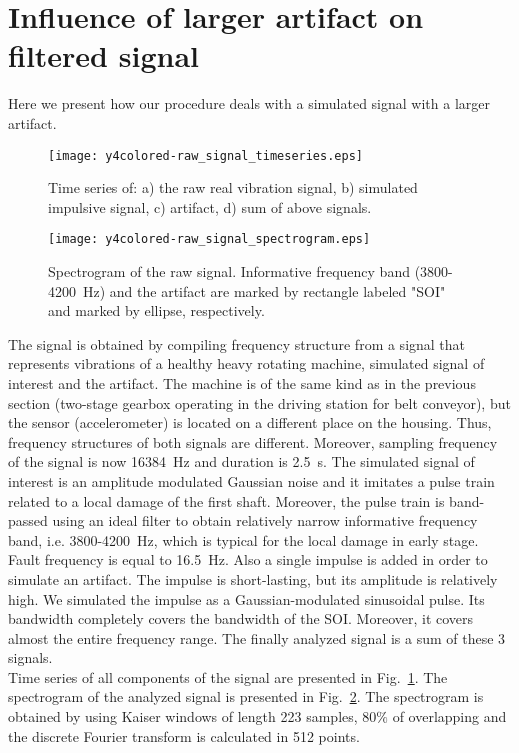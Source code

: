 \documentclass[11pt]{article} %
\begin{document}
\section{Influence of larger artifact on filtered signal}\label{artifact_influence}
Here we present how our procedure deals with a simulated signal with a larger artifact.
\begin{figure}[!ht]
\begin{center}
\texttt{[image: y4colored-raw\_signal\_timeseries.eps]}
\caption{Time series of: a) the raw real vibration signal, b) simulated impulsive signal, c) artifact, d) sum of above signals.\label{y4-timeseries}}
\end{center}
\end{figure}
\begin{figure}[!ht]
\begin{center}
\texttt{[image: y4colored-raw\_signal\_spectrogram.eps]}
\caption{Spectrogram of the raw signal. Informative frequency band (3800-4200~Hz) and the artifact are marked by rectangle labeled "SOI" and marked by ellipse, respectively.\label{y4-coloring-stft}}
\end{center}
\end{figure}
The signal is obtained by compiling frequency structure from a signal that represents vibrations of a healthy heavy rotating machine, simulated signal of interest and the artifact. The machine is of the same kind as in the previous section (two-stage gearbox operating in the driving station for belt conveyor), but the sensor (accelerometer) is located on a different place on the housing. Thus, frequency structures of both signals are different. Moreover, sampling frequency of the signal is now 16384~Hz and duration is 2.5~s. The simulated signal of interest is an amplitude modulated Gaussian noise and it imitates a pulse train related to a local damage of the first shaft. Moreover, the pulse train is band-passed using an ideal filter to obtain relatively narrow informative frequency band, i.e. 3800-4200~Hz, which is typical for the local damage in early stage. Fault frequency is equal to 16.5~Hz. Also a single impulse is added in order to simulate an artifact. The impulse is short-lasting, but its amplitude is relatively high. We simulated the impulse as a Gaussian-modulated sinusoidal pulse. Its bandwidth completely covers the bandwidth of the SOI. Moreover, it covers almost the entire frequency range. The finally analyzed signal is a sum of these 3 signals.\\
Time series of all components of the signal are presented in Fig.~\ref{y4-timeseries}. The spectrogram of the analyzed signal is presented in Fig.~\ref{y4-coloring-stft}. The spectrogram is obtained by using Kaiser windows of length 223 samples, $80\%$ of overlapping and the discrete Fourier transform is calculated in 512 points.\\
\end{document}
